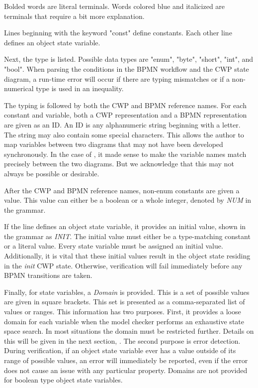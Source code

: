 Bolded words are literal terminals. Words colored blue and italicized are terminals that require a bit more explanation.

Lines beginning with the keyword "const" define constants. Each other line defines an object state variable. 

Next, the type is listed. Possible data types are "enum", "byte", "short", "int", and "bool". When parsing the conditions in the BPMN workflow and the CWP state diagram, a run-time error will occur if there are typing mismatches or if a non-numerical type is used in an inequality. 

The typing is followed by both the CWP and BPMN reference names. For each constant and variable, both a CWP representation and a BPMN representation are given as an ID. An ID is any alphanumeric string beginning with a letter. The string may also contain some special characters. This allows the author to map variables between two diagrams that may not have been developed synchronously. In the case of \facetoface, it made sense to make the variable names match precisely between the two diagrams. But we acknowledge that this may not always be possible or desirable. 

After the CWP and BPMN reference names, non-enum constants are given a value. This value can either be a boolean or a whole integer, denoted by \emph{NUM} in the grammar.

If the line defines an object state variable, it provides an initial value, shown in the grammar as \emph{INIT}. The initial value must either be a type-matching constant or a literal value. Every state variable must be assigned an initial value. Additionally, it is vital that these initial values result in the object state residing in the \emph{init} CWP state. Otherwise, verification will fail immediately before any BPMN transitions are taken.

Finally, for state variables, a \emph{Domain} is provided. This is a set of possible values are given in square brackets. This set is presented as a comma-separated list of values or ranges. This information has two purposes. First, it provides a loose domain for each variable when the model checker performs an exhaustive state space search. In most situations the domain must be restricted further. Details on this will be given in the next section, . The second purpose is error detection. During verification, if an object state variable ever has a value outside of its range of possible values, an error will immediately be reported, even if the error does not cause an issue with any particular property. Domains are not provided for boolean type object state variables.

